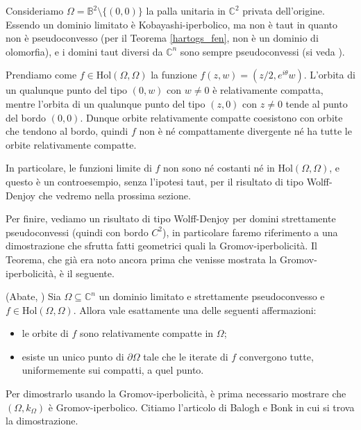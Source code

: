 \begin{ex} \label{servetaut}
    Consideriamo $\Omega=\mathbb{B}^2\setminus\{(0,0)\}$ la palla unitaria in $\mathbb{C}^2$ privata dell'origine. Essendo un dominio limitato è Kobayashi-iperbolico, ma non è taut in quanto non è pseudoconvesso (per il Teorema \ref{hartogs_fen}, non è un dominio di olomorfia), e i domini taut diversi da $\mathbb{C}^n$ sono sempre pseudoconvessi (si veda \cite[Theorem F]{W}).

    Prendiamo come $f\in\text{Hol}(\Omega,\Omega)$ la funzione $f(z,w)=(z/2,e^{i\theta}w)$. L'orbita di un qualunque punto del tipo $(0,w)$ con $w\not=0$ è relativamente compatta, mentre l'orbita di un qualunque punto del tipo $(z,0)$ con $z\not=0$ tende al punto del bordo $(0,0)$. Dunque orbite relativamente compatte coesistono con orbite che tendono al bordo, quindi $f$ non è né compattamente divergente né ha tutte le orbite relativamente compatte.
    
    In particolare, le funzioni limite di $f$ non sono né costanti né in $\text{Hol}(\Omega,\Omega)$, e questo è un controesempio, senza l'ipotesi taut, per il risultato di tipo Wolff-Denjoy che vedremo nella prossima sezione.
\end{ex}

Per finire, vediamo un risultato di tipo Wolff-Denjoy per domini strettamente pseudoconvessi (quindi con bordo $C^2$), in particolare faremo riferimento a una dimostrazione che sfrutta fatti geometrici quali la Gromov-iperbolicità. Il Teorema, che già era noto ancora prima che venisse mostrata la Gromov-iperbolicità, è il seguente.

\begin{thm} \label{abate_wd}
    (Abate, \cite[Theorem 0.5]{A2}) Sia $\Omega \subseteq \mathbb{C}^n$ un dominio limitato e strettamente pseudoconvesso e $f \in \text{Hol}(\Omega,\Omega)$. Allora vale esattamente una delle seguenti affermazioni:
    \begin{itemize}
        \item le orbite di $f$ sono relativamente compatte in $\Omega$;
        \item esiste un unico punto di $\partial\Omega$ tale che le iterate di $f$ convergono tutte, uniformemente sui compatti, a quel punto.
    \end{itemize}
\end{thm}

Per dimostrarlo usando la Gromov-iperbolicità, è prima necessario mostrare che $(\Omega,k_{\Omega})$ è Gromov-iperbolico. Citiamo l'articolo di Balogh e Bonk in cui si trova la dimostrazione.

